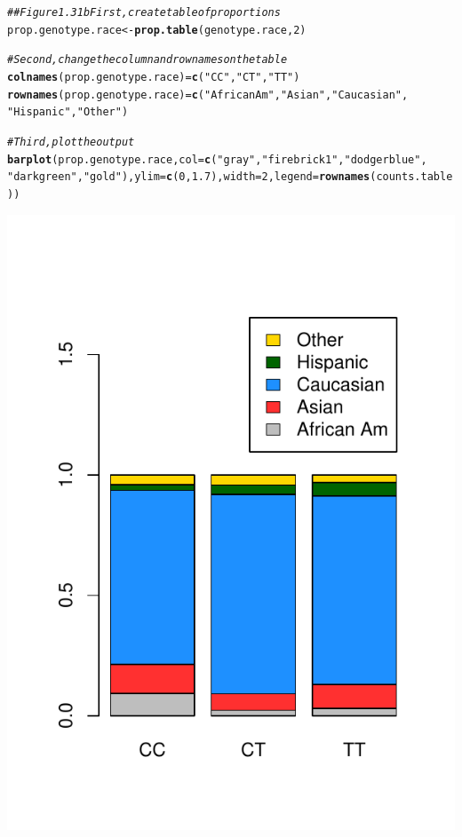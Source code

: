 \documentclass{report}\usepackage[]{graphicx}\usepackage[]{color}
\makeatletter
\def\maxwidth{ %
  \ifdim\Gin@nat@width>\linewidth
    \linewidth
  \else
    \Gin@nat@width
  \fi
}
\newcommand{\hlnum}[1]{\textcolor[rgb]{0.686,0.059,0.569}{#1}}%
\newcommand{\hlstr}[1]{\textcolor[rgb]{0.192,0.494,0.8}{#1}}%
\newcommand{\hlcom}[1]{\textcolor[rgb]{0.678,0.584,0.686}{\textit{#1}}}%
\newcommand{\hlstd}[1]{\textcolor[rgb]{0.345,0.345,0.345}{#1}}%
\newcommand{\hlkwb}[1]{\textcolor[rgb]{0.69,0.353,0.396}{#1}}%
\newcommand{\hlkwc}[1]{\textcolor[rgb]{0.333,0.667,0.333}{#1}}%
\newcommand{\hlkwd}[1]{\textcolor[rgb]{0.737,0.353,0.396}{\textbf{#1}}}%
\newenvironment{kframe}{%
 \def\at@end@of@kframe{}%
 \ifinner\ifhmode%
  \def\at@end@of@kframe{\end{minipage}}%
  \begin{minipage}{\columnwidth}%
 \fi\fi%
 \def\FrameCommand##1{\hskip\@totalleftmargin \hskip-\fboxsep
 \colorbox{shadecolor}{##1}\hskip-\fboxsep
     \hskip-\linewidth \hskip-\@totalleftmargin \hskip\columnwidth}%
 \MakeFramed {\advance\hsize-\width
   \@totalleftmargin\z@ \linewidth\hsize
   \@setminipage}}%
 {\par\unskip\endMakeFramed%
 \at@end@of@kframe}
\newenvironment{knitrout}{}{} %
\makeatother
\begin{document}
\begin{knitrout}
\color{fgcolor}\begin{kframe}
\begin{alltt}
\hlcom{## Figure 1.31b First, create table of proportions}
\hlstd{prop.genotype.race} \hlkwb{<-} \hlkwd{prop.table}\hlstd{(genotype.race,} \hlnum{2}\hlstd{)}

\hlcom{# Second, change the column and row names on the table}
\hlkwd{colnames}\hlstd{(prop.genotype.race)} \hlkwb{=} \hlkwd{c}\hlstd{(}\hlstr{"CC"}\hlstd{,} \hlstr{"CT"}\hlstd{,} \hlstr{"TT"}\hlstd{)}
\hlkwd{rownames}\hlstd{(prop.genotype.race)} \hlkwb{=} \hlkwd{c}\hlstd{(}\hlstr{"African Am"}\hlstd{,} \hlstr{"Asian"}\hlstd{,} \hlstr{"Caucasian"}\hlstd{,}
    \hlstr{"Hispanic"}\hlstd{,} \hlstr{"Other"}\hlstd{)}

\hlcom{# Third, plot the output}
\hlkwd{barplot}\hlstd{(prop.genotype.race,} \hlkwc{col} \hlstd{=} \hlkwd{c}\hlstd{(}\hlstr{"gray"}\hlstd{,} \hlstr{"firebrick1"}\hlstd{,} \hlstr{"dodgerblue"}\hlstd{,}
    \hlstr{"darkgreen"}\hlstd{,} \hlstr{"gold"}\hlstd{),} \hlkwc{ylim} \hlstd{=} \hlkwd{c}\hlstd{(}\hlnum{0}\hlstd{,} \hlnum{1.7}\hlstd{),} \hlkwc{width} \hlstd{=} \hlnum{2}\hlstd{,} \hlkwc{legend} \hlstd{=} \hlkwd{rownames}\hlstd{(counts.table))}
\end{alltt}
\end{kframe}

{\centering \includegraphics[width=\maxwidth]{figure/unnamed-chunk-68-1} 

}
\end{knitrout}
\end{document}
